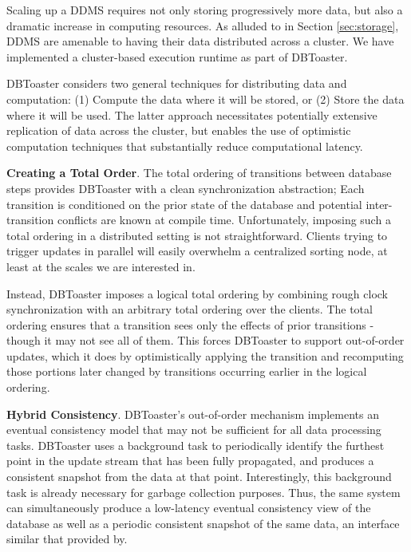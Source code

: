 Scaling up a DDMS requires not only storing progressively more data, but also a dramatic increase in computing resources.  As alluded to in Section \ref{sec:storage}, DDMS are amenable to having their data distributed across a cluster.  We have implemented a cluster-based execution runtime as part of DBToaster.


DBToaster considers two general techniques for distributing data and computation: (1) Compute the data where it will be stored, or (2) Store the data where it will be used.  The latter approach necessitates potentially extensive replication of data across the cluster, but enables the use of optimistic computation techniques that substantially reduce computational latency.

\medspace 

{\bf Creating a Total Order}\/.
The total ordering of transitions between database steps provides DBToaster with a clean synchronization abstraction; Each transition is conditioned on the prior state of the database and potential inter-transition conflicts are known at compile time.  Unfortunately, imposing such a total ordering in a distributed setting is not straightforward.  Clients trying to trigger updates in parallel will easily overwhelm a centralized sorting node, at least at the scales we are interested in.  

Instead, DBToaster imposes a logical total ordering by combining rough clock synchronization with an arbitrary total ordering over the clients.  The total ordering ensures that a transition sees only the effects of prior transitions - though it may not see all of them.  This forces DBToaster to support out-of-order updates, which it does by optimistically applying the transition and recomputing those portions later changed by transitions occurring earlier in the logical ordering.

\medspace

{\bf Hybrid Consistency}\/.
DBToaster's out-of-order mechanism implements an eventual consistency model that may not be sufficient for all data processing tasks.  DBToaster uses a background task to periodically identify the furthest point in the update stream that has been fully propagated, and produces a consistent snapshot from the data at that point.  Interestingly, this background task is already necessary for garbage collection purposes.  Thus, the same system can simultaneously produce a low-latency eventual consistency view of the database as well as a periodic consistent snapshot of the same data, an interface similar that provided by\cite{bayou}.

